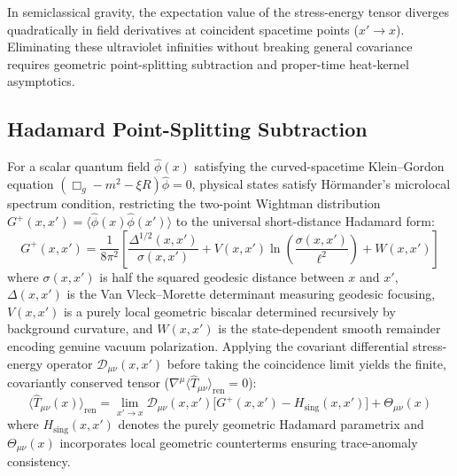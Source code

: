 \documentclass[11pt,a4paper]{article}
\begin{document}
In semiclassical gravity, the expectation value of the stress-energy tensor diverges quadratically in field derivatives at coincident spacetime points ($x' \to x$). Eliminating these ultraviolet infinities without breaking general covariance requires geometric point-splitting subtraction and proper-time heat-kernel asymptotics.

\subsection{Hadamard Point-Splitting Subtraction}
For a scalar quantum field $\hat{\phi}(x)$ satisfying the curved-spacetime Klein--Gordon equation $(\Box_g - m^2 - \xi R)\hat{\phi} = 0$, physical states satisfy H\"ormander's microlocal spectrum condition, restricting the two-point Wightman distribution $G^+(x, x') = \langle \hat{\phi}(x)\hat{\phi}(x') \rangle$ to the universal short-distance Hadamard form:
\begin{equation}
G^+(x, x') = \frac{1}{8\pi^2} \left[ \frac{\Delta^{1/2}(x, x')}{\sigma(x, x')} + V(x, x') \ln\left(\frac{\sigma(x, x')}{\ell^2}\right) + W(x, x') \right]
\end{equation}
where $\sigma(x, x')$ is half the squared geodesic distance between $x$ and $x'$, $\Delta(x, x')$ is the Van Vleck--Morette determinant measuring geodesic focusing, $V(x, x')$ is a purely local geometric biscalar determined recursively by background curvature, and $W(x, x')$ is the state-dependent smooth remainder encoding genuine vacuum polarization. Applying the covariant differential stress-energy operator $\mathcal{D}_{\mu\nu}(x, x')$ before taking the coincidence limit yields the finite, covariantly conserved tensor ($\nabla^\mu \langle \hat{T}_{\mu\nu} \rangle_{\text{ren}} = 0$):
\begin{equation}
\langle \hat{T}_{\mu\nu}(x) \rangle_{\text{ren}} = \lim_{x' \to x} \mathcal{D}_{\mu\nu}(x, x') \big[ G^+(x, x') - H_{\text{sing}}(x, x') \big] + \Theta_{\mu\nu}(x)
\end{equation}
where $H_{\text{sing}}(x, x')$ denotes the purely geometric Hadamard parametrix and $\Theta_{\mu\nu}(x)$ incorporates local geometric counterterms ensuring trace-anomaly consistency.
\end{document}

